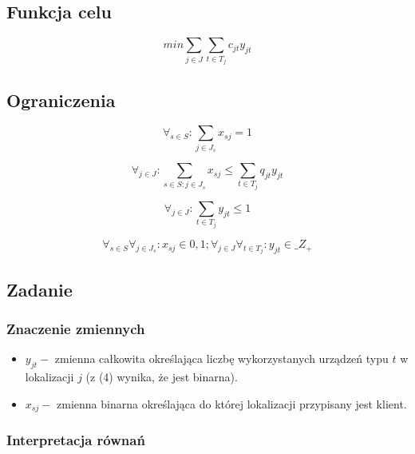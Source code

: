\documentclass{article}
\begin{document}
\subsection{Funkcja celu}

\begin{equation}
min \sum_{j \in J} \sum_{t \in T_j} c_{jt}y_{jt}
\end{equation}

\subsection{Ograniczenia}

\begin{equation}
  \forall_{s \in {S}} : \sum_{j \in J_s} x_{sj} = 1
\end{equation}

\begin{equation}
  \forall_{j \in J} : \sum_{s \in S : j \in J_s } x_{sj} \leq \sum_{t \in T_j} q_{jt}y_{jt}
\end{equation}

\begin{equation}
  \forall_{j \in J} : \sum_{t \in T_j} y_{jt} \leq 1
\end{equation}

\begin{equation*}
  \forall_{s \in S} \forall_{j \in J_s} : x_{sj} \in {0,1}; \forall_{j \in J} \forall_{t \in T_j}: y_{jt} \in \mathbb_{Z_+}
\end{equation*}

\subsection{Zadanie}

\subsubsection{Znaczenie zmiennych}

\begin{itemize}
  \item $y_{jt} - $ zmienna całkowita określająca liczbę wykorzystanych urządzeń typu $t$ w lokalizacji $j$ (z (4) wynika, że jest binarna).
  \item $x_{sj} - $ zmienna binarna określająca do której lokalizacji przypisany jest klient.
\end{itemize}

\subsubsection{Interpretacja równań}
\end{document}
